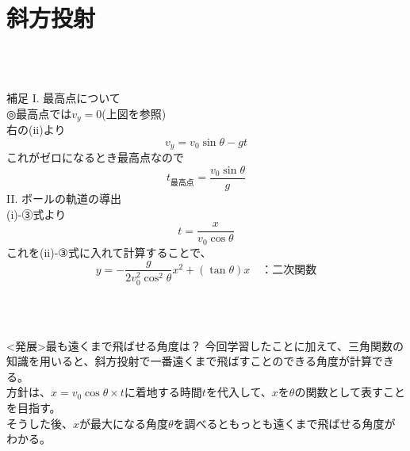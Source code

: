 \documentclass[11pt,twoside]{article}
\begin{document}
	\section{斜方投射}
		\begin{minipage}[t]{0.44\linewidth}
			\\\\
			\begin{itembox}[l]{補足}
				I. 最高点について\\
				◎最高点では$v_y=0$(上図を参照)\\
				右の(ii)より
				\[
					v_y=v_0\sin\theta -gt
				\]
				これがゼロになるとき最高点なので
				\[
					t_{\text{最高点}}=\frac{v_0\sin\theta}{g}
				\]
				II. ボールの軌道の導出\\
				(i)-③式より
				\[
					t=\frac{x}{v_0\cos\theta}
				\]
				これを(ii)-③式に入れて計算することで、
				\[
					y=-\frac{g}{2v_0^2\cos^2\theta}x^2+(\tan\theta)x\quad\text{：二次関数}
				\]
			\end{itembox}\\\\
			\begin{itembox}[l]{<発展>最も遠くまで飛ばせる角度は？}
				今回学習したことに加えて、三角関数の知識を用いると、斜方投射で一番遠くまで飛ばすことのできる角度が計算できる。\\
				方針は、$x=v_{0}\cos\theta ×t$に着地する時間$t$を代入して、$x$を$\theta$の関数として表すことを目指す。\\
				そうした後、$x$が最大になる角度$\theta$を調べるともっとも遠くまで飛ばせる角度がわかる。

			\end{itembox}
		\end{minipage}
\end{document}
